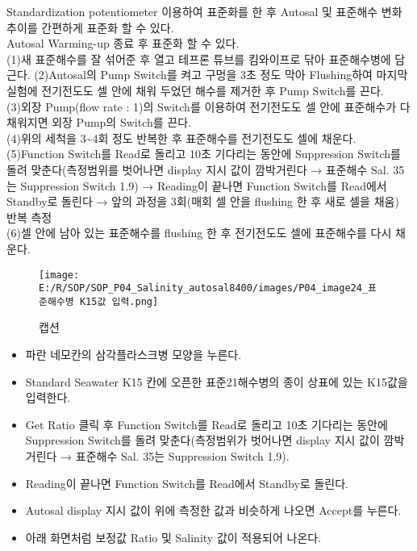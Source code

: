 \documentclass[
]{book}
\providecommand{\tightlist}{%
  \setlength{\itemsep}{0pt}\setlength{\parskip}{0pt}}
\begin{document}
Standardization potentiometer 이용하여 표준화를 한 후 Autosal 및 표준해수 변화 추이를 간편하게 표준화 할 수 있다.\\
Autosal Warming-up 종료 후 표준화 할 수 있다.\\
(1)새 표준해수를 잘 섞어준 후 열고 테프론 튜브를 킴와이프로 닦아 표준해수병에 담근다.
(2)Autosal의 Pump Switch를 켜고 구멍을 3초 정도 막아 Flushing하여 마지막 실험에 전기전도도 셀 안에 채워 두었던 해수를 제거한 후 Pump Switch를 끈다.\\
(3)외장 Pump(flow rate : 1)의 Switch를 이용하여 전기전도도 셀 안에 표준해수가 다 채워지면 외장 Pump의 Switch를 끈다.\\
(4)위의 세척을 3\textasciitilde4회 정도 반복한 후 표준해수를 전기전도도 셀에 채운다.\\
(5)Function Switch를 Read로 돌리고 10초 기다리는 동안에 Suppression Switch를 돌려 맞춘다(측정범위를 벗어나면 display 지시 값이 깜박거린다 → 표준해수 Sal. 35는 Suppression Switch 1.9) → Reading이 끝나면 Function Switch를 Read에서 Standby로 돌린다 → 앞의 과정을 3회(매회 셀 안을 flushing 한 후 새로 셀을 채움) 반복 측정\\
(6)셀 안에 남아 있는 표준해수를 flushing 한 후 전기전도도 셀에 표준해수를 다시 채운다.

\begin{figure}
\centering
\texttt{[image: E:/R/SOP/SOP\_P04\_Salinity\_autosal8400/images/P04\_image24\_표준해수병 K15값 입력.png]}
\caption{캡션}
\end{figure}

\begin{itemize}
\tightlist
\item
  파란 네모칸의 삼각플라스크병 모양을 누른다.\\
\item
  Standard Seawater K15 칸에 오픈한 표준21해수병의 종이 상표에 있는 K15값을 입력한다.\\
\item
  Get Ratio 클릭 후 Function Switch를 Read로 돌리고 10초 기다리는 동안에 Suppression Switch를 돌려 맞춘다(측정범위가 벗어나면 display 지시 값이 깜박거린다 → 표준해수 Sal. 35는 Suppression Switch 1.9).\\
\item
  Reading이 끝나면 Function Switch를 Read에서 Standby로 돌린다.\\
\item
  Autosal display 지시 값이 위에 측정한 값과 비슷하게 나오면 Accept를 누른다.\\
\item
  아래 화면처럼 보정값 Ratio 및 Salinity 값이 적용되어 나온다.
\end{itemize}
\end{document}
